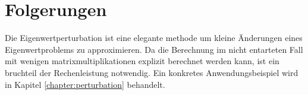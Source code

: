 %
%
%
\section{Folgerungen
\label{ew:section:folgerungen}}

Die Eigenwertperturbation ist eine elegante methode um kleine Änderungen eines Eigenwertproblems zu approximieren.
Da die Berechnung im nicht entarteten Fall mit wenigen matrixmultiplikationen explizit berechnet werden kann, ist ein bruchteil der Rechenleistung notwendig.
Ein konkretes Anwendungsbeispiel wird in Kapitel \ref{chapter:perturbation} behandelt.



